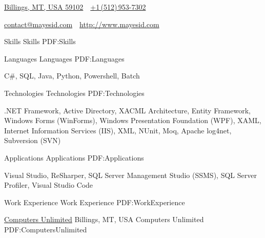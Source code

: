 \documentclass[letterpaper,MMMyyyy,nonstopmode]{simpleresumecv}
\newcommand{\CVAuthor}{Isaac Mayes}
\newcommand{\CVWebpage}{http://www.mayesid.com}
\begin{document}

\Title{\CVAuthor}

\begin{SubTitle}
\href{https://www.google.com/maps/place/Billings,+MT/}
{Billings, MT, USA 59102}
\,\SubBulletSymbol\,
\href{tel:+15129537302}
{+1\,(512)\,953-7302}
\par
\href{mailto:contact@mayesid.com}
{contact@mayesid.com}
\,\SubBulletSymbol\,
\href{\CVWebpage}
{\url{\CVWebpage}}
\end{SubTitle}

\begin{Body}


\Section
{Skills}
{Skills}
{PDF:Skills}

\SubSection
{Languages}
{Languages}
{PDF:Languages}

\BulletItem
C\#, SQL, Java, Python, Powershell, Batch

\Gap

\SubSection
{Technologies}
{Technologies}
{PDF:Technologies}

\BulletItem
.NET Framework, Active Directory, XACML Architecture, Entity Framework, Windows Forms (WinForms), Windows Presentation Foundation (WPF), XAML, Internet Information Services (IIS), XML, NUnit, Moq, Apache log4net, Subversion (SVN)

\Gap

\SubSection
{Applications}
{Applications}
{PDF:Applications}

\BulletItem
Visual Studio, ReSharper, SQL Server Management Studio (SSMS), SQL Server Profiler, Visual Studio Code


\Section
{Work \newline Experience}
{Work Experience}
{PDF:WorkExperience}

\SubSection
{\href{http://www.cu.net}
{Computers Unlimited}
\hfill Billings, MT, USA}
{Computers Unlimited}
{PDF:ComputersUnlimited}

\Gap


\end{Body}
\end{document}
